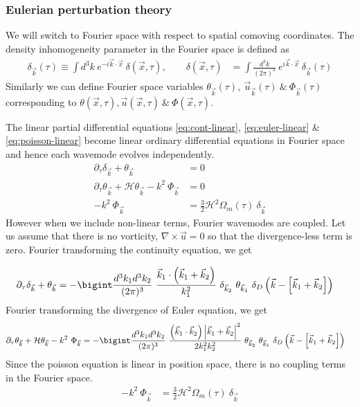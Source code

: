 \documentclass[12pt]{article}
\begin{document}
\subsubsection{Eulerian perturbation theory}
We will switch to Fourier space with respect to spatial comoving coordinates. The density inhomogeneity parameter in the Fourier space is defined as
\begin{align}
\delta_{\vec{k}}(\tau) \equiv \int d^3k ~e^{-i \vec{k} \cdot \vec{x}} ~\delta(\vec{x},\tau), \qquad
\delta (\vec{x},\tau) &= \int \frac{d^3k}{(2\pi)^3} ~e^{i \vec{k} \cdot \vec{x}} ~\delta_{\vec{k}}(\tau)
\end{align}
Similarly we can define Fourier space variables $\theta_{\vec{k}}(\tau), ~\vec{u}_{\vec{k}}(\tau) ~\&~ \Phi_{\vec{k}}(\tau)$ corresponding to $\theta (\vec{x},\tau), \vec{u} (\vec{x},\tau) ~\&~ \Phi (\vec{x},\tau)$.

The linear partial differential equations \eqref{eq:cont-linear}, \eqref{eq:euler-linear} \& \eqref{eq:poisson-linear} become linear ordinary differential equations in Fourier space and hence each wavemode evolves independently.
\begin{align}
\partial_{\tau} \delta_{\vec{k}} + \theta_{\vec{k}} &= 0\\
\partial_{\tau} \theta_{\vec{k}} + \mathcal{H} \theta_{\vec{k}} - k^2 ~\Phi_{\vec{k}} &= 0\\
-k^2 ~\Phi_{\vec{k}} &= \frac{3}{2} \mathcal{H}^2 \Omega_{m}(\tau) ~\delta_{\vec{k}}
\end{align}
However when we include non-linear terms, Fourier wavemodes are coupled. Let us assume that there is no vorticity, $\nabla \times \vec{u} = 0$ so that the divergence-less term is zero.  Fourier transforming the continuity equation, we get

\begin{align}
\label{eq:cont-eqn-fourier}
\partial_{\tau} \delta_{\vec{k}} + \theta_{\vec{k}} &= - \bigint \frac{d^3k_1 d^3k_2} { (2 \pi)^3} ~\frac{\vec{k}_1 \cdot \left( \vec{k}_1 + \vec{k}_2 \right) }{k_1^2}  ~\delta_{\vec{k}_2} ~\theta_{\vec{k}_1} ~\delta_D \left( \vec{k} - \left[ \vec{k}_1 + \vec{k}_2 \right] \right)
\end{align}
Fourier transforming the divergence of Euler equation, we get
\begin{align}
\label{eq:euler-eqn-fourier}
\partial_{\tau} \theta_{\vec{k}} + \mathcal{H} \theta_{\vec{k}} - k^2 ~\Phi_{\vec{k}} &= - \bigint \frac{d^3k_1 d^3k_2} { (2 \pi)^3} ~\frac{\left( \vec{k}_1 \cdot \vec{k}_2 \right) \left| \vec{k}_1 + \vec{k}_2 \right|^2 }{2 k_1^2 k_2^2}  ~\theta_{\vec{k}_2} ~\theta_{\vec{k}_1} ~\delta_D \left( \vec{k} - \left[ \vec{k}_1 + \vec{k}_2 \right] \right)
\end{align}
Since the poisson equation is linear in position space, there is no coupling terms in the Fourier space.
\begin{align}
-k^2 ~\Phi_{\vec{k}} &= \frac{3}{2} \mathcal{H}^2 \Omega_{m}(\tau) ~\delta_{\vec{k}}
\end{align}
\end{document}
